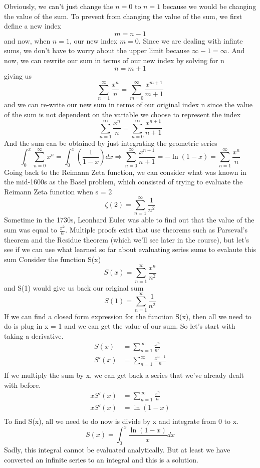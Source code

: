 \documentclass{article}
\newcommand{\be}{\begin{equation}}
\newcommand{\ee}{\end{equation}}
\newcommand{\sumzero}{\sum_{n=0}^\infty}
\newcommand{\sumone}{\sum_{n=1}^\infty}
\begin{document}
Obviously, we can't just change the $n = 0$ to $n = 1$ because we would be changing the value of the sum.
To prevent from changing the value of the sum, we first define a new index
\be
m = n - 1
\ee
and now, when $n = 1$, our new index $m = 0$.
Since we are dealing with infinte sums, we don't have to worry about the upper limit because $\infty - 1 = \infty$.
And now, we can rewrite our sum in terms of our new index by solving for n
\be
n = m + 1
\ee
giving us
\be
\sumone \frac{x^n}{n} = \sum_{m = 0}^{\infty} \frac{x^{m + 1}}{m + 1}
\ee
and we can re-write our new sum in terms of our original index n since the value of the sum is not dependent on the variable we choose to represent the index
\be
\sumone \frac{x^n}{n} = \sum_{n = 0}^{\infty} \frac{x^{n + 1}}{n + 1}
\ee
And the sum can be obtained by just integrating the geometric series
\be
\int_{0}^{x} \sumzero x^n = \int_{0}^{x} \left( \frac{1}{1 - x} \right) dx \Rightarrow \sum_{n = 0}^{\infty} \frac{x^{n + 1}}{n + 1} =  - \ln(1 - x) = \sumone \frac{x^n}{n}
\ee
Going back to the Reimann Zeta function, we can consider what was known in the mid-1600s as the Basel problem, which consisted of trying to evaluate the Reimann Zeta function when s = 2
\be
\zeta(2) = \sum_{n=1}^\infty \frac{1}{n^2}
\ee
Sometime in the 1730s, Leonhard Euler was able to find out that the value of the sum was equal to $\frac{\pi^2}{6}$.
Multiple proofs exist that use theorems such as Parseval's theorem and the Residue theorem (which we'll see later in the course), but let's see if we can use what learned so far about evaluating series sums to evalaute this sum
Consider the function S(x)
\be
S(x) = \sum_{n=1}^\infty \frac{x^n}{n^2}
\ee
and S(1) would give us back our original sum
\be
S(1) = \sum_{n=1}^\infty \frac{1}{n^2}
\ee
If we can find a closed form expression for the function S(x), then all we need to do is plug in x = 1 and we can get the value of our sum. So let's start with taking a derivative.
\be
\begin{split}
	S(x) &= \sum_{n=1}^\infty \frac{x^n}{n^2}\\
	S'(x) &= \sum_{n=1}^\infty \frac{x^{n-1}}{n}\\
\end{split}
\ee
If we multiply the sum by x, we can get back a series that we've already dealt with before.
\be
\begin{split}
	x S'(x) &= \sum_{n=1}^\infty \frac{x^{n}}{n}\\
	x S'(x) &= \ln(1-x)\\
\end{split}
\ee
To find S(x), all we need to do now is divide by x and integrate from 0 to x.
\be
	S(x) = \int_0^x \frac{\ln(1-x)}{x} dx
\ee
Sadly, this integral cannot be evaluated analytically.
But at least we have converted an infinite series to an integral and this is a solution.
\end{document}
